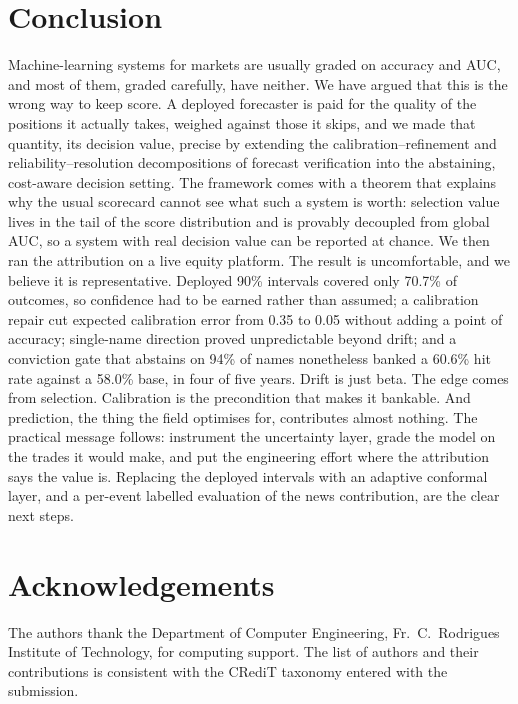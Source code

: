 \documentclass[10pt,a4paper,oneside]{article}
\theoremstyle{definition}
\theoremstyle{plain}
\begin{document}
\section{Conclusion}
\label{sec:conclusion}
Machine-learning systems for markets are usually graded on accuracy and AUC, and most
of them, graded carefully, have neither. We have argued that this is the wrong way to
keep score. A deployed forecaster is paid for the quality of the positions it actually
takes, weighed against those it skips, and we made that quantity, its decision value,
precise by extending the calibration--refinement and reliability--resolution
decompositions of forecast verification into the abstaining, cost-aware decision
setting. The framework comes with a theorem that explains why the usual scorecard
cannot see what such a system is worth: selection value lives in the tail of the score
distribution and is provably decoupled from global AUC, so a system with real decision
value can be reported at chance. We then ran the attribution on a live equity platform.
The result is uncomfortable, and we believe it is representative. Deployed 90\%
intervals covered only 70.7\% of outcomes, so confidence had to be earned rather than
assumed; a calibration repair cut expected calibration error from 0.35 to 0.05 without
adding a point of accuracy; single-name direction proved unpredictable beyond drift;
and a conviction gate that abstains on 94\% of names nonetheless banked a 60.6\% hit
rate against a 58.0\% base, in four of five years. Drift is just beta. The edge comes
from selection. Calibration is the precondition that makes it bankable. And
prediction, the thing the field optimises for, contributes almost nothing. The
practical message follows: instrument the uncertainty layer, grade the model on the
trades it would make, and put the engineering effort where the attribution says the
value is. Replacing the deployed intervals with an adaptive conformal layer, and a
per-event labelled evaluation of the news contribution, are the clear next steps.

\section*{Acknowledgements}
The authors thank the Department of Computer Engineering, Fr.\ C.\ Rodrigues Institute
of Technology, for computing support. The list of authors and their contributions is
consistent with the CRediT taxonomy entered with the submission.
\end{document}

